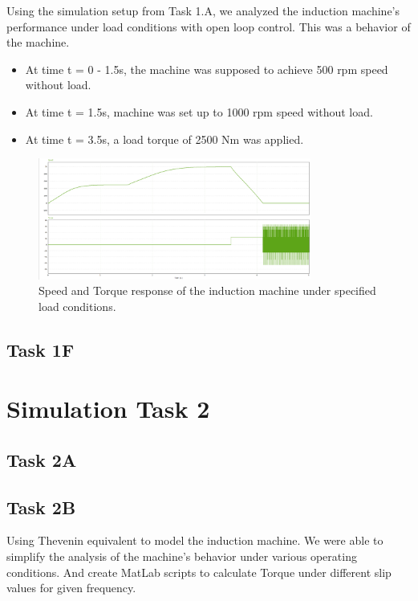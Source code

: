 \documentclass[12pt,a4paper]{report}
\begin{document}
Using the simulation setup from Task 1.A, we analyzed the induction machine's performance under load conditions with open loop control. This was a behavior of the machine.
\begin{itemize}
    \item At time t = 0 - 1.5s, the machine was supposed to achieve 500 rpm speed without load.
    \item At time t = 1.5s, machine was set up to 1000 rpm speed without load.
    \item At time t = 3.5s, a load torque of 2500 Nm was applied.
\end{itemize}

\begin{figure}[H]
    \centering
    \includegraphics[width=0.8\textwidth]{1ESimSpeedTorque.png}
    \caption{Speed and Torque response of the induction machine under specified load conditions.}
    \label{fig:speed-torque-response}
\end{figure}

\section{Task 1F}
\label{Task 1F}

\chapter{Simulation Task 2}
\label{sec:simulation-task-2}


\section{Task 2A}
\label{sec:task-2a}

\section{Task 2B}
\label{sec:task-2b}

Using Thevenin equivalent to model the induction machine. We were able to simplify the analysis of the machine's behavior under various operating conditions.
And create MatLab scripts to calculate Torque under different slip values for given frequency.
\end{document}
